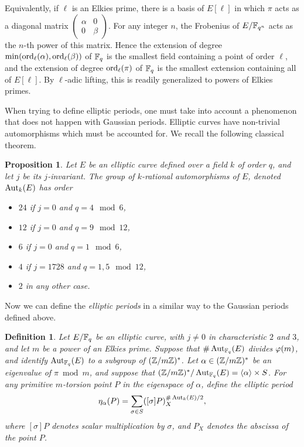 \documentclass{article}
\newtheorem{Def}{Definition}
\newtheorem{Prop}{Proposition}
\begin{document}
Equivalently, if $\ell$ is an Elkies prime, there is a basis of
$E[\ell]$ in which $\pi$ acts as a diagonal matrix
$\left(\begin{smallmatrix}\alpha&0\\0&\beta\end{smallmatrix}\right)$. For
any integer $n$, the Frobenius of $E/\mathbb{F}_{q^n}$ acts as the $n$-th
power of this matrix. Hence the extension of degree
$\min(\operatorname{ord}_\ell(\alpha),\operatorname{ord}_\ell(\beta))$ of $\mathbb{F}_q$ is the smallest
field containing a point of order $\ell$, and the extension of degree
$\operatorname{ord}_\ell(\pi)$ of $\mathbb{F}_q$ is the smallest extension containing all of
$E[\ell]$. By $\ell$-adic lifting, this is readily generalized to
powers of Elkies primes.

When trying to define elliptic periods, one must take into account a
phenomenon that does not happen with Gaussian periods. Elliptic curves
have non-trivial automorphisms which must be accounted for. We recall
the following classical theorem.

\begin{Prop}
  Let $E$ be an elliptic curve defined over a field $k$ of order $q$,
  and let $j$ be its $j$-invariant. The group of $k$-rational
  automorphisms of $E$, denoted $\operatorname{Aut}_k(E)$ has order
  \begin{itemize}
  \item $24$ if $j=0$ and $q=4\mod 6$,
  \item $12$ if $j=0$ and $q=9\mod 12$,
  \item $6$ if $j=0$ and $q=1 \mod 6$,
  \item $4$ if $j=1728$ and $q = 1,5 \mod 12$,
  \item $2$ in any other case.
  \end{itemize}
\end{Prop}

Now we can define the \emph{elliptic periods} in a similar way to the
Gaussian periods defined above.

\begin{Def}
  Let $E/\mathbb{F}_q$ be an elliptic curve, with $j\ne0$ in characteristic
  $2$ and $3$, and let $m$ be a power of an Elkies prime. Suppose that
  $\#\operatorname{Aut}_{\mathbb{F}_q}(E)$ divides $\varphi(m)$, and identify $\operatorname{Aut}_{\mathbb{F}_q}(E)$ to a
  subgroup of $(\mathbb{Z}/m\mathbb{Z})^\ast$. Let $\alpha\in(\mathbb{Z}/m\mathbb{Z})^\ast$ be an
  eigenvalue of $\pi\bmod m$, and suppose that
  $(\mathbb{Z}/m\mathbb{Z})^\ast/\operatorname{Aut}_{\mathbb{F}_q}(E)=\langle\alpha\rangle\times S$. For any
  primitive $m$-torsion point $P$ in the eigenspace of $\alpha$,
  define the elliptic period
  \begin{equation}
    \eta_\alpha(P) = \sum_{\sigma\in S} ([\sigma]P)_X^{\#\operatorname{Aut}_k(E)/2},
  \end{equation}
  where $[\sigma]P$ denotes scalar multiplication by $\sigma$, and
  $P_X$ denotes the abscissa of the point $P$.
\end{Def}
\end{document}
